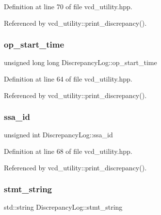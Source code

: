 Definition at line 70 of file vcd\+\_\+utility.\+hpp.



Referenced by vcd\+\_\+utility\+::print\+\_\+discrepancy().

\mbox{\label{structDiscrepancyLog_abb83d670a7944e9d23122a964941f18d}} 
\subsubsection{\texorpdfstring{op\+\_\+start\+\_\+time}{op\_start\_time}}
{\footnotesize\ttfamily unsigned long long Discrepancy\+Log\+::op\+\_\+start\+\_\+time}



Definition at line 64 of file vcd\+\_\+utility.\+hpp.



Referenced by vcd\+\_\+utility\+::print\+\_\+discrepancy().

\mbox{\label{structDiscrepancyLog_ae9ede71c651ff5631a5dc9e59e444e8a}} 
\subsubsection{\texorpdfstring{ssa\+\_\+id}{ssa\_id}}
{\footnotesize\ttfamily unsigned int Discrepancy\+Log\+::ssa\+\_\+id}



Definition at line 68 of file vcd\+\_\+utility.\+hpp.



Referenced by vcd\+\_\+utility\+::print\+\_\+discrepancy().

\mbox{\label{structDiscrepancyLog_a011c5d8f95583bea19f9c516995bb81f}} 
\subsubsection{\texorpdfstring{stmt\+\_\+string}{stmt\_string}}
{\footnotesize\ttfamily std\+::string Discrepancy\+Log\+::stmt\+\_\+string}



